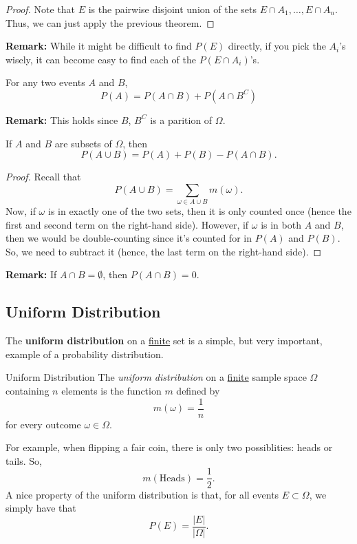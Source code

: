 \documentclass[letterpaper]{article}
\begin{document}
\begin{mdframed}[]
    \begin{proof}
        Note that $E$ is the pairwise disjoint union of the sets $E \cap A_1, \dots, E \cap A_n$. Thus, we can just apply the previous theorem. 
    \end{proof}
\end{mdframed}

\textbf{Remark:} While it might be difficult to find $P(E)$ directly, if you pick the $A_i$'s wisely, it can become easy to find each of the $P(E \cap A_i)$'s.

\begin{corollary}{}{}
    For any two events $A$ and $B$,
    \[P(A) = P(A \cap B) + P(A \cap B^C)\]
\end{corollary}
\textbf{Remark:} This holds since $B$, $B^C$ is a parition of $\Omega$. 

\begin{theorem}
    If $A$ and $B$ are subsets of $\Omega$, then 
    \[P(A \cup B) = P(A) + P(B) - P(A \cap B).\]
\end{theorem}
\begin{mdframed}[]
    \begin{proof}
        Recall that
        \[P(A \cup B) = \sum_{\omega \in A \cup B} m(\omega).\]
        Now, if $\omega$ is in exactly one of the two sets, then it is only counted once (hence the first and second term on the right-hand side). However, if $\omega$ is in both $A$ and $B$, then we would be double-counting since it's counted for in $P(A)$ and $P(B)$. So, we need to subtract it (hence, the last term on the right-hand side). 
    \end{proof}
\end{mdframed}
\textbf{Remark:} If $A \cap B = \emptyset$, then $P(A \cap B) = 0$.

\subsection{Uniform Distribution}
The \textbf{uniform distribution} on a \underline{finite} set is a simple, but very important, example of a probability distribution. 

\begin{definition}{Uniform Distribution}{}
    The \emph{uniform distribution} on a \underline{finite} sample space $\Omega$ containing $n$ elements is the function $m$ defined by 
    \[m(\omega) = \frac{1}{n}\]
    for every outcome $\omega \in \Omega$. 
\end{definition}
For example, when flipping a fair coin, there is only two possiblities: heads or tails. So,
\[m(\text{Heads}) = \frac{1}{2}.\]
A nice property of the uniform distribution is that, for all events $E \subset \Omega$, we simply have that 
\[P(E) = \frac{|E|}{|\Omega|}.\]
\end{document}

